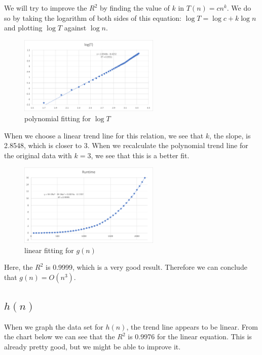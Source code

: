 \documentclass[12pt]{article}
\begin{document}
\noindent We will try to improve the $R^2$ by finding the value of $k$ in $T(n) = cn^k$. We do so by taking the logarithm of both sides of this equation: $\log{T}=\log{c}+k\log{n}$ and plotting $\log{T}$ against $\log{n}$. 

\begin{figure}[H]
\centering
\includegraphics[width=0.6\textwidth,height=\textheight,keepaspectratio]{gn_logT}
\caption{polynomial fitting for $\log{T}$}
\label{Figure: gn_2}
\end{figure}

\noindent When we choose a linear trend line for this relation, we see that $k$, the slope, is 2.8548, which is closer to 3. When we recalculate the polynomial trend line for the original data with $k=3$, we see that this is a better fit.

\begin{figure}[H]
\centering
\includegraphics[width=0.6\textwidth,height=\textheight,keepaspectratio]{gn_Tn2}
\caption{linear fitting for $g(n)$}
\label{Figure: gn_3}
\end{figure}

\noindent Here, the $R^2$ is 0.9999, which is a very good result. Therefore we can conclude that $g(n) = O(n^3)$.

\subsection{\(h(n)\)}
When we graph the data set for $h(n)$, the trend line appears to be linear. From the chart below we can see that the $R^2$ is 0.9976 for the linear equation. This is already pretty good, but we might be able to improve it.
\end{document}
